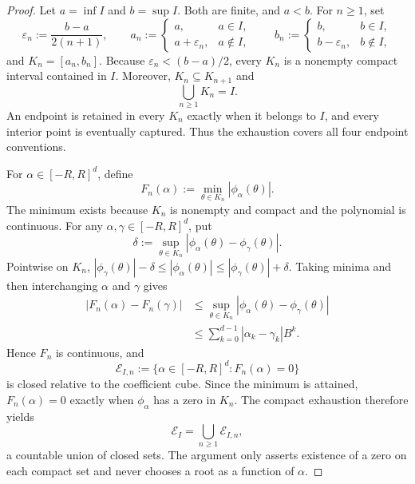 \begin{proof}
Let $a=\inf I$ and $b=\sup I$.  Both are finite, and $a<b$.  For
$n\geq1$, set
\[
\varepsilon_n:=\frac{b-a}{2(n+1)},
\qquad
a_n:=
\begin{cases}
a,&a\in I,\\
a+\varepsilon_n,&a\notin I,
\end{cases}
\qquad
b_n:=
\begin{cases}
b,&b\in I,\\
b-\varepsilon_n,&b\notin I,
\end{cases}
\]
and $K_n=[a_n,b_n]$.  Because
$\varepsilon_n<(b-a)/2$, every $K_n$ is a nonempty compact interval
contained in $I$.  Moreover, $K_n\subseteq K_{n+1}$ and
\[
\bigcup_{n\geq1}K_n=I.
\]
An endpoint is retained in every $K_n$ exactly when it belongs to $I$,
and every interior point is eventually captured.  Thus the exhaustion
covers all four endpoint conventions.

For $\alpha\in[-R,R]^d$, define
\[
F_n(\alpha):=\min_{\theta\in K_n}|\phi_\alpha(\theta)|.
\]
The minimum exists because $K_n$ is nonempty and compact and the
polynomial is continuous.  For any
$\alpha,\gamma\in[-R,R]^d$, put
\[
\delta:=\sup_{\theta\in K_n}
|\phi_\alpha(\theta)-\phi_\gamma(\theta)|.
\]
Pointwise on $K_n$,
$|\phi_\gamma(\theta)|-\delta\leq|\phi_\alpha(\theta)|
\leq|\phi_\gamma(\theta)|+\delta$.  Taking minima and then interchanging
$\alpha$ and $\gamma$ gives
\[
\begin{aligned}
|F_n(\alpha)-F_n(\gamma)|
&\leq\sup_{\theta\in K_n}
  |\phi_\alpha(\theta)-\phi_\gamma(\theta)|\\
&\leq\sum_{k=0}^{d-1}|\alpha_k-\gamma_k|B^k.
\end{aligned}
\]
Hence $F_n$ is continuous, and
\[
\mathcal E_{I,n}:=\{\alpha\in[-R,R]^d:F_n(\alpha)=0\}
\]
is closed relative to the coefficient cube.  Since the minimum is
attained, $F_n(\alpha)=0$ exactly when $\phi_\alpha$ has a zero in $K_n$.
The compact exhaustion therefore yields
\[
\mathcal E_I=\bigcup_{n\geq1}\mathcal E_{I,n},
\]
a countable union of closed sets.  The argument only asserts existence of
a zero on each compact set and never chooses a root as a function of
$\alpha$.
\end{proof}

